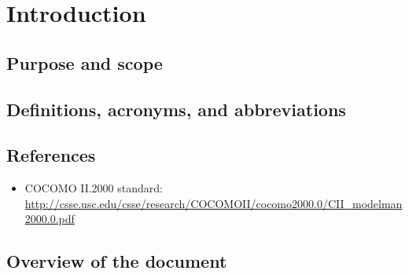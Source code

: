 \chapter{Introduction}\label{chap:introduction}


\section{Purpose and scope}
\lipsum[2]


\section{Definitions, acronyms, and abbreviations}
\lipsum[2]


\section{References}\label{sec:references}
\begin{itemize}
	\item COCOMO II.2000 standard: \url{http://csse.usc.edu/csse/research/COCOMOII/cocomo2000.0/CII_modelman2000.0.pdf}
\end{itemize}

\section{Overview of the document} 
\lipsum[2]





